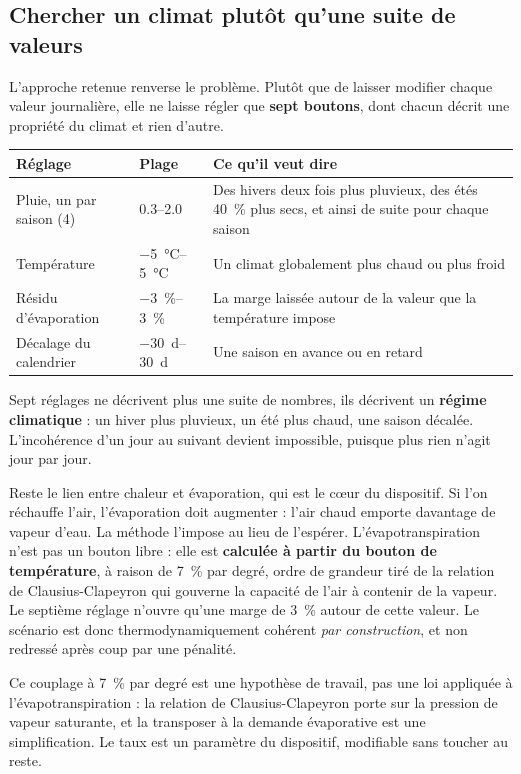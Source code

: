 \subsection{Chercher un climat plutôt qu'une suite de valeurs}

L'approche retenue renverse le problème. Plutôt que de laisser modifier chaque valeur
journalière, elle ne laisse régler que \textbf{sept boutons}, dont chacun décrit une propriété
du climat et rien d'autre.

\begin{center}
\begin{tabularx}{\textwidth}{@{}llX@{}}
\toprule
\textbf{Réglage} & \textbf{Plage} & \textbf{Ce qu'il veut dire} \\
\midrule
Pluie, un par saison (4) & \numrange{0,3}{2,0} & Des hivers deux fois plus pluvieux, des étés
\SI{40}{\percent} plus secs, et ainsi de suite pour chaque saison \\
Température & \SIrange{-5}{5}{\celsius} & Un climat globalement plus chaud ou plus froid \\
Résidu d'évaporation & \SIrange{-3}{3}{\percent} & La marge laissée autour de la valeur que la
température impose \\
Décalage du calendrier & \SIrange{-30}{30}{\day} & Une saison en avance ou en retard \\
\bottomrule
\end{tabularx}
\end{center}

Sept réglages ne décrivent plus une suite de nombres, ils décrivent un \textbf{régime
climatique} : un hiver plus pluvieux, un été plus chaud, une saison décalée. L'incohérence d'un
jour au suivant devient impossible, puisque plus rien n'agit jour par jour.

Reste le lien entre chaleur et évaporation, qui est le cœur du dispositif. Si l'on réchauffe
l'air, l'évaporation doit augmenter : l'air chaud emporte davantage de vapeur d'eau. La méthode
l'impose au lieu de l'espérer. L'évapotranspiration n'est pas un bouton libre : elle est
\textbf{calculée à partir du bouton de température}, à raison de \SI{7}{\percent} par degré,
ordre de grandeur tiré de la relation de Clausius-Clapeyron qui gouverne la capacité de l'air à
contenir de la vapeur. Le septième réglage n'ouvre qu'une marge de \SI{3}{\percent} autour de
cette valeur. Le scénario est donc thermodynamiquement cohérent \emph{par construction}, et non
redressé après coup par une pénalité.

Ce couplage à \SI{7}{\percent} par degré est une hypothèse de travail, pas une loi appliquée à
l'évapotranspiration : la relation de Clausius-Clapeyron porte sur la pression de vapeur
saturante, et la transposer à la demande évaporative est une simplification. Le taux est un
paramètre du dispositif, modifiable sans toucher au reste.

